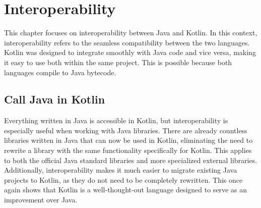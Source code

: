 \documentclass[a4paper, 11pt]{article}
\begin{document}
\section{Interoperability}
  This chapter focuses on interoperability between Java and Kotlin. In this context, interoperability refers to the seamless compatibility between the two languages. Kotlin was designed to integrate smoothly with Java code and vice versa, making it easy to use both within the same project. This is possible because both languages compile to Java bytecode.

\subsection{Call Java in Kotlin}
  Everything written in Java is accessible in Kotlin, but interoperability is especially useful when working with Java libraries. There are already countless libraries written in Java that can now be used in Kotlin, eliminating the need to rewrite a library with the same functionality specifically for Kotlin. This applies to both the official Java standard libraries and more specialized external libraries. Additionally, interoperability makes it much easier to migrate existing Java projects to Kotlin, as they do not need to be completely rewritten. This once again shows that Kotlin is a well-thought-out language designed to serve as an improvement over Java.
\end{document}
